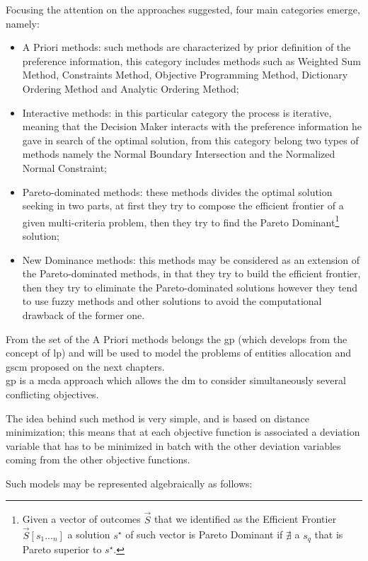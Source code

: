 \begin{doublespace}
Focusing the attention on the approaches suggested, four main categories emerge, namely:

\begin{itemize}
	\item A Priori methods: such methods are characterized by prior definition of the preference information, this category includes methods such as Weighted Sum Method, Constraints Method, Objective Programming Method, Dictionary Ordering Method and Analytic Ordering Method;   
	\item Interactive methods: in this particular category the process is iterative, meaning that the Decision Maker interacts with the preference information he gave in search of the optimal solution, from this category belong two types of methods namely the Normal Boundary Intersection and the Normalized Normal Constraint;
	\item Pareto-dominated methods: these methods divides the optimal solution seeking in two parts, at first they try to compose the efficient frontier of a given multi-criteria problem, then they try to find the Pareto Dominant\footnote{Given a vector of outcomes $\vec{S}$ that we identified as the Efficient Frontier $\vec{S}[s_1..._n]$ a solution $s^{\star}$ of such vector is Pareto Dominant if $\nexists$ a $s_q$ that is Pareto superior to $s^{\star}$.} solution;
	\item New Dominance methods: this methods may be considered as an extension of the Pareto-dominated methods, in that they try to build the efficient frontier, then they try to eliminate the Pareto-dominated solutions however they tend to use fuzzy methods and other solutions to avoid the computational drawback of the former one.  
\end{itemize}

From the set of the A Priori methods belongs the \gls{gp} (which develops from the concept of \gls{lp}) and will be used to model the problems of entities allocation and \gls{gscm} proposed on the next chapters.
\\
\gls{gp} is a \gls{mcda} approach which allows the \gls{dm} to consider simultaneously several conflicting objectives.

The idea behind such method is very simple, and is based on distance minimization; this means that at each objective function is associated a deviation variable that has to be minimized in batch with the other deviation variables coming from the other objective functions.

Such models may be represented algebraically as follows:


\end{doublespace}
